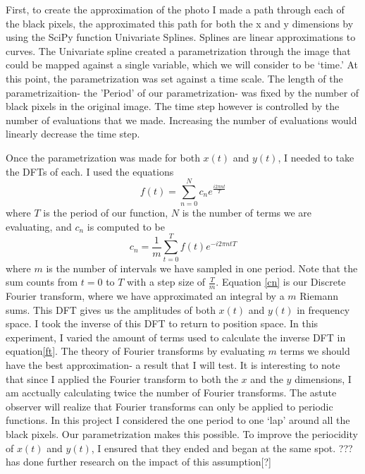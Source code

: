 \documentclass[psamsfonts]{amsart}
\theoremstyle{definition}
\theoremstyle{remark}
\numberwithin{equation}{section}
\begin{document}
First, to create the approximation of the photo I made a path through each of the black pixels, the approximated this path for both the x and y dimensions by using the SciPy function Univariate Splines. Splines are linear approximations to curves. The Univariate spline created a parametrization through the image that could be mapped against a single variable, which we will consider to be `time.' At this point, the parametrization was set against a time scale. The length of the parametrizaition- the 'Period' of our parametrization- was fixed by the number of black pixels in the original image. The time step however is controlled by the number of evaluations that we made. Increasing the number of evaluations would linearly decrease the time step. 

Once the parametrization was made for both $x(t)$ and $y(t)$, I needed to take the DFTs of each. I used the equations \begin{equation}\label{ft}
f(t) = \sum_{n=0}^N c_ne^{\frac{i2\pi nt}{T}}
\end{equation}
where $T$ is the period of our function, $N$ is the number of terms we are evaluating, and $c_n$ is computed to be 
\begin{equation}\label{cn}
c_n = \frac{1}{m} \sum_{t=0}^T f(t)e^{{-i2\pi nt}{T}}
\end{equation}
where $m$ is the number of intervals we have sampled in one period. Note that the sum counts from $t=0$ to $T$ with a step size of $\frac{T}{m}$. Equation \ref{cn} is our Discrete Fourier transform, where we have approximated an integral by a $m$ Riemann sums. This DFT gives us the amplitudes of both $x(t)$ and $y(t)$ in frequency space. I took the inverse of this DFT to return to position space. In this experiment, I varied the amount of terms used to calculate the inverse DFT in equation\ref{ft}. The theory of Fourier transforms by evaluating $m$ terms we should have the best approximation- a result that I will test.  
It is interesting to note that since I applied the Fourier transform to both the $x$ and the $y$ dimensions, I am acctually calculating twice the number of Fourier transforms. 
The astute observer will realize that Fourier transforms can only be applied to periodic functions. In this project I considered the one period to one `lap' around all the black pixels. Our parametrization makes this possible. To improve the periocidity of $x(t)$ and $y(t)$, I ensured that they ended and began at the same spot. ??? has done further research on the impact of this assumption[?]
 
\end{document}
